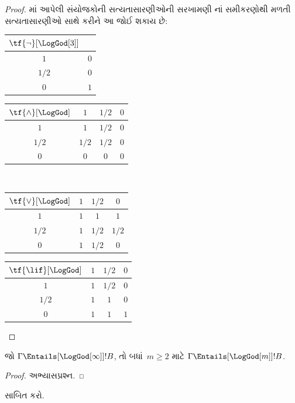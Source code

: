\begin{proof}
  માં આપેલી સંયોજકોની
  સત્યતાસારણીઓની સરખામણી નાં
  સમીકરણોથી મળતી સત્યતાસારણીઓ સાથે કરીને આ જોઈ શકાય છે:
  \begin{center}
    \begin{tabular}{c|c} 
      $\tf{\lnot}[\LogGod[3]]$ & \\ 
      \hline  
      $1$ & $0$ \\ 
      $1/2$ & $0$ \\
      $0$ & $1$ 
    \end{tabular}
    \quad
    \begin{tabular}{c|ccc} 
      $\tf{\land}[\LogGod]$ & $1$ & $1/2$ & $0$ \\ 
      \hline 
      $1$ & $1$ & $1/2$ & $0$ \\ 
      $1/2$ & $1/2$ & $1/2$ & $0$\\ 
      $0$ & $0$ & $0$ & $0$ 
    \end{tabular}
    \\[2ex]
    \begin{tabular}{c|ccc} 
      $\tf{\lor}[\LogGod]$ & $1$ & $1/2$ & $0$ \\ 
      \hline 
      $1$ & $1$ & $1$ & $1$ \\ 
      $1/2$ & $1$ & $1/2$ & $1/2$ \\
      $0$ & $1$ & $1/2$ & $0$ 
    \end{tabular}
    \quad
    \begin{tabular}{c|ccc} 
      $\tf{\lif}[\LogGod]$ & $1$ & $1/2$ & $0$ \\ 
      \hline 
      $1$ & $1$ & $1/2$ & $0$ \\ 
      $1/2$ & $1$ & $1$ & $0$  \\ 
      $0$ & $1$ & $1$ & $1$ 
    \end{tabular}
  \end{center} 
\end{proof}

\begin{prop}
  જો $\Gamma \Entails[\LogGod[\infty]] !B$, તો બધાં~$m \ge 2$
  માટે $\Gamma \Entails[\LogGod[m]] !B$.
\end{prop}

\begin{proof}
  અભ્યાસપ્રશ્ન.
\end{proof}

\begin{prob}
   સાબિત કરો.
\end{prob}

